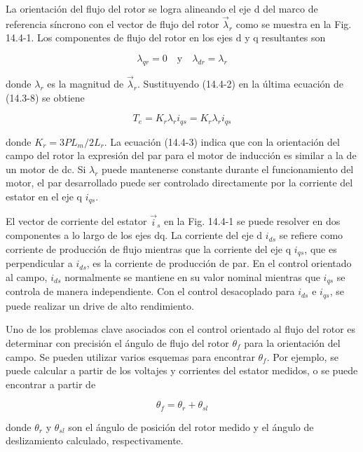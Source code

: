 \documentclass[letterpaper,12pt]{article}
\begin{document}
La orientación del flujo del rotor se logra alineando el eje d del marco de referencia síncrono con el vector de flujo del rotor $\vec{\lambda}_r$ como se muestra en la Fig. 14.4-1. Los componentes de flujo del rotor en los ejes d y q resultantes son

\begin{equation}
\lambda_{qr} = 0 \quad \text{y} \quad \lambda_{dr} = \lambda_r \tag{14.4-2}
\end{equation}

donde $\lambda_r$ es la magnitud de $\vec{\lambda}_r$. Sustituyendo (14.4-2) en la última ecuación de (14.3-8) se obtiene

\begin{equation}
T_e = K_r \lambda_r i_{qs} = K_r \lambda_r i_{qs} \tag{14.4-3}
\end{equation}

donde $K_r = 3PL_m/2L_r$. La ecuación (14.4-3) indica que con la orientación del campo del rotor la expresión del par para el motor de inducción es similar a la de un motor de dc. Si $\lambda_r$ puede mantenerse constante durante el funcionamiento del motor, el par desarrollado puede ser controlado directamente por la corriente del estator en el eje q $i_{qs}$.

El vector de corriente del estator $\vec{i}_s$ en la Fig. 14.4-1 se puede resolver en dos componentes a lo largo de los ejes dq. La corriente del eje d $i_{ds}$ se refiere como corriente de producción de flujo mientras que la corriente del eje q $i_{qs}$, que es perpendicular a $i_{ds}$, es la corriente de producción de par. En el control orientado al campo, $i_{ds}$ normalmente se mantiene en su valor nominal mientras que $i_{qs}$ se controla de manera independiente. Con el control desacoplado para $i_{ds}$ e $i_{qs}$, se puede realizar un drive de alto rendimiento.

Uno de los problemas clave asociados con el control orientado al flujo del rotor es determinar con precisión el ángulo de flujo del rotor $\theta_f$ para la orientación del campo. Se pueden utilizar varios esquemas para encontrar $\theta_f$. Por ejemplo, se puede calcular a partir de los voltajes y corrientes del estator medidos, o se puede encontrar a partir de

\begin{equation}
\theta_f = \theta_r + \theta_{sl} \tag{14.4-4}
\end{equation}

donde $\theta_r$ y $\theta_{sl}$ son el ángulo de posición del rotor medido y el ángulo de deslizamiento calculado, respectivamente.
\end{document}
